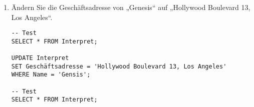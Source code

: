 \documentclass{bschlangaul-aufgabe}
\begin{document}
\begin{enumerate}

\item Ändern Sie die Geschäftsadresse von „Genesis“ auf „Hollywood
Boulevard 13, Los Angeles“.

\begin{bAntwort}
\begin{verbatim}
-- Test
SELECT * FROM Interpret;

UPDATE Interpret
SET Geschäftsadresse = 'Hollywood Boulevard 13, Los Angeles'
WHERE Name = 'Gensis';

-- Test
SELECT * FROM Interpret;
\end{verbatim}
\end{bAntwort}

\end{enumerate}
\end{document}
